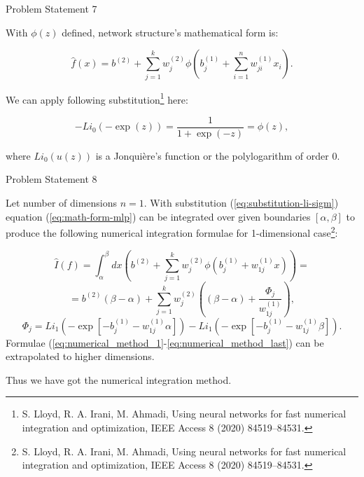 \documentclass[9pt]{beamer}
\begin{document}
\begin{frame}{Problem Statement 7}

\noindent With $\phi(z)$ defined, network structure's mathematical form is:

\begin{equation}
    \label{eq:math-form-mlp}
    \hat{f}(x) = b^{(2)} + \sum_{j=1}^{k}w_j^{(2)}\phi(b_j^{(1)}+\sum_{i=1}^{n}w_{ji}^{(1)}x_{i}).
\end{equation}

We can apply following substitution\footnote{S. Lloyd, R. A. Irani, M. Ahmadi, Using neural networks for fast numerical integration and
optimization, IEEE Access 8 (2020) 84519–84531.} here:

\begin{equation}
    \label{eq:substitution-li-sigm}
    -Li_0(-\exp(z)) = \frac{1}{1+\exp(-z)} = \phi(z),
\end{equation}

\noindent where $Li_0(u(z))$ is a Jonquière's function or the polylogarithm of order 0.
    
\end{frame}

\begin{frame}{Problem Statement 8}

Let number of dimensions $n = 1$. With substitution (\ref{eq:substitution-li-sigm}) equation (\ref{eq:math-form-mlp}) can be integrated over given boundaries $[\alpha, \beta]$ to produce the following numerical integration formulae for 1-dimensional case\footnote{S. Lloyd, R. A. Irani, M. Ahmadi, Using neural networks for fast numerical integration and
optimization, IEEE Access 8 (2020) 84519–84531.}:

\begin{equation*}
\hat{I}(f) = \int_{\alpha}^{\beta} dx \left(b^{(2)} + \sum_{j=1}^{k}w_j^{(2)}\phi(b_j^{(1)} + w_{1j}^{(1)}x) \right) =
\end{equation*}
\begin{equation}
= b^{(2)}(\beta - \alpha) + \sum_{j=1}^{k}w_j^{(2)} \left( (\beta - \alpha) + \frac{\Phi_j}{w_{1j}^{(1)}} \right),
\label{eq:numerical_method_1}
\end{equation}
\begin{equation}
\label{eq:numerical_method_last}
\Phi_j = Li_1(-\exp[-b_j^{(1)}-w_{1j}^{(1)}\alpha]) - Li_1(-\exp[-b_j^{(1)}-w_{1j}^{(1)}\beta]).
\end{equation}
Formulae (\ref{eq:numerical_method_1}-\ref{eq:numerical_method_last}) can be extrapolated to higher dimensions.

Thus we have got the numerical integration method.

\end{frame}
\end{document}
